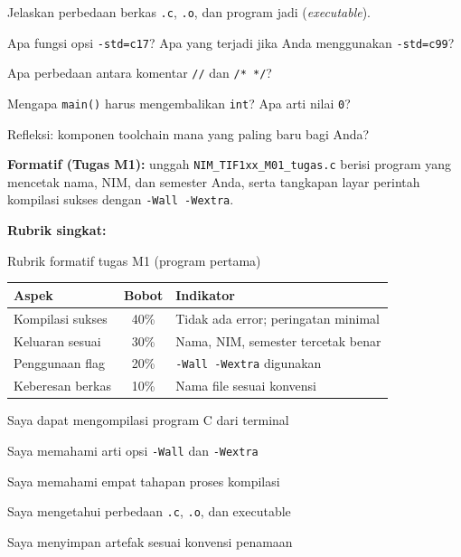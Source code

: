 \documentclass[../main.tex]{subfiles}
\begin{document}
\begin{latihan}
  \item Jelaskan perbedaan berkas \texttt{.c}, \texttt{.o}, dan program jadi (\textit{executable}).
  \item Apa fungsi opsi \texttt{-std=c17}? Apa yang terjadi jika Anda menggunakan \texttt{-std=c99}?
  \item Apa perbedaan antara komentar \texttt{//} dan \texttt{/* */}?
  \item Mengapa \texttt{main()} harus mengembalikan \texttt{int}? Apa arti nilai \texttt{0}?
  \item Refleksi: komponen toolchain mana yang paling baru bagi Anda?
\end{latihan}

\begin{asesmen}
\textbf{Formatif (Tugas M1):} unggah \texttt{NIM\_TIF1xx\_M01\_tugas.c} berisi program yang mencetak nama, NIM, dan semester Anda, serta tangkapan layar perintah kompilasi sukses dengan \texttt{-Wall -Wextra}.

\textbf{Rubrik singkat:}

\begin{modultable}[]{Rubrik formatif tugas M1 (program pertama)}
\begin{tabular}{|l|c|p{7cm}|}
\hline
\textbf{Aspek} & \textbf{Bobot} & \textbf{Indikator} \\
\hline
Kompilasi sukses & 40\% & Tidak ada error; peringatan minimal \\
\hline
Keluaran sesuai & 30\% & Nama, NIM, semester tercetak benar \\
\hline
Penggunaan flag & 20\% & \texttt{-Wall -Wextra} digunakan \\
\hline
Keberesan berkas & 10\% & Nama file sesuai konvensi \\
\hline
\end{tabular}
\end{modultable}
\end{asesmen}

\begin{checklist}
  \item Saya dapat mengompilasi program C dari terminal
  \item Saya memahami arti opsi \texttt{-Wall} dan \texttt{-Wextra}
  \item Saya memahami empat tahapan proses kompilasi
  \item Saya mengetahui perbedaan \texttt{.c}, \texttt{.o}, dan executable
  \item Saya menyimpan artefak sesuai konvensi penamaan
\end{checklist}
\end{document}
